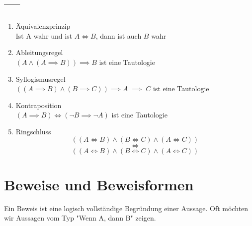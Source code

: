 \documentclass[a4paper]{article}
\begin{document}
\section{---}
\begin{TheoremBox}
	\begin{enumerate}[label=\arabic*)]
		\item Äquivalenzprinzip\\
			Ist A wahr und ist $A \iff B$, dann ist auch $B$ wahr
		\item Ableitungsregel\\
			$(A \land (A \implies B)) \implies B$ ist eine Tautologie
		\item Syllogismusregel\\
			$((A \implies B) \land (B \implies C)) \implies A \;\implies\; C$ ist eine Tautologie
		\item Kontraposition\\
			$(A \implies B) \iff (\neg B \implies \neg A)$ ist eine Tautologie
		\item Ringschluss\\
			\begin{equation*}
				((A \iff B) \land (B \iff C) \land (A \iff C))
			\end{equation*}
			\begin{equation*}
				\iff
			\end{equation*}
			\begin{equation*}
				((A \iff B) \land (B \iff C) \land (A \iff C))
			\end{equation*}
	\end{enumerate}
\end{TheoremBox}

\section{Beweise und Beweisformen}
Ein Beweis ist eine logisch vollständige Begründung einer Aussage. Oft möchten wir Aussagen vom Typ "Wenn A, dann B" zeigen.
\end{document}
